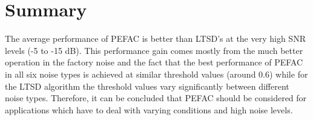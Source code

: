 
\section{Summary}

The average performance of PEFAC is better than LTSD's at the very high SNR levels (-5 to -15 dB). This performance gain comes mostly from the much better operation in the factory noise and the fact that the best performance of PEFAC in all six noise types is achieved at similar threshold values (around 0.6) while for the LTSD algorithm the threshold values vary significantly between different noise types. Therefore, it can be concluded that PEFAC should be considered for applications which have to deal with varying conditions and high noise levels.